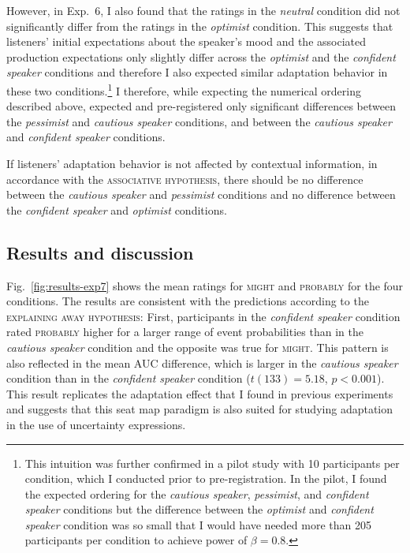 However, in Exp.~6, I also found that the ratings in the \textit{neutral} condition did not significantly differ from the ratings in the \textit{optimist} condition. This suggests that listeners' initial expectations about the speaker's mood and the associated production expectations only slightly differ across the \textit{optimist} and the \textit{confident speaker} conditions and therefore I also expected similar adaptation behavior in these two conditions.\footnote{This intuition was further confirmed in a pilot study with 10 participants per condition, which I conducted prior to pre-registration. In the pilot, I found the expected ordering for the \textit{cautious speaker}, \textit{pessimist}, and \textit{confident speaker} conditions but the difference between the \textit{optimist} and \textit{confident speaker} condition was so small that I would have needed more than 205 participants per condition to achieve power of $\beta=0.8$.} I therefore, while expecting the numerical ordering described above, expected and pre-registered only significant differences between the \textit{pessimist} and \textit{cautious speaker} conditions, and between the \textit{cautious speaker} and \textit{confident speaker} conditions.

If listeners' adaptation behavior is not affected by contextual information, in accordance with the \textsc{associative hypothesis}, there should be no difference between the \textit{cautious speaker} and  \textit{pessimist} conditions and no difference between the \textit{confident speaker} and \textit{optimist} conditions.

\subsection{Results and discussion}

Fig.~\ref{fig:results-exp7} shows the mean ratings for \textsc{might} and \textsc{probably} for the four conditions. The results are consistent with the predictions according to the \textsc{explaining away hypothesis}: First, participants in the \textit{confident speaker} condition rated \textsc{probably} higher for a larger range of event probabilities than in the \textit{cautious speaker} condition and the opposite was true for \textsc{might}. This pattern is also reflected in the mean AUC difference, which is larger in the \textit{cautious speaker} condition than in the \textit{confident speaker} condition ($t(133)=5.18$, $p < 0.001$). This result replicates the adaptation effect that I found in previous experiments and suggests that this seat map paradigm is also suited for studying adaptation in the use of uncertainty expressions.


